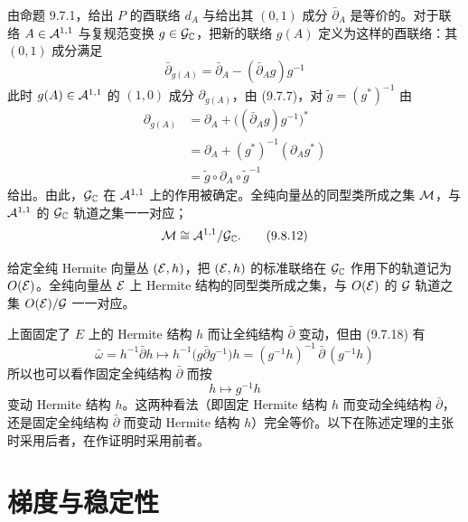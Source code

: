 由命题 9.7.1，给出 $P$ 的酉联络 $d_A$ 与给出其 $(0,1)$ 成分 $\bar\partial_A$ 是等价的。对于联络 $A\in\mathcal{A}^{1,1}$ 与复规范变换 $g\in\mathcal{G}_{\mathbb{C}}$，把新的联络 $g(A)$ 定义为这样的酉联络：其 $(0,1)$ 成分满足
\begin{equation}
  \bar\partial_{g(A)} = \bar\partial_A - (\bar\partial_A g)g^{-1}
  \tag{9.8.8}
\end{equation}
此时 $g(A)\in\mathcal{A}^{1,1}$ 的 $(1,0)$ 成分 $\partial_{g(A)}$，由 (9.7.7)，对 $\tilde g=(g^*)^{-1}$ 由
\begin{align}
  \partial_{g(A)} &= \partial_A + \bigl((\bar\partial_A g)g^{-1}\bigr)^*
  \tag{9.8.9}\\
  &= \partial_A + (g^*)^{-1}(\partial_A g^*)
  \tag{9.8.10}\\
  &= \tilde g\circ\partial_A\circ\tilde g^{-1}
  \tag{9.8.11}
\end{align}
给出。由此，$\mathcal{G}_{\mathbb{C}}$ 在 $\mathcal{A}^{1,1}$ 上的作用被确定。全纯向量丛的同型类所成之集 $\mathcal{M}$，与 $\mathcal{A}^{1,1}$ 的 $\mathcal{G}_{\mathbb{C}}$ 轨道之集一一对应；
\begin{equation}
  \mathcal{M} \cong \mathcal{A}^{1,1}/\mathcal{G}_{\mathbb{C}}.
  \tag{9.8.12}
\end{equation}

给定全纯 Hermite 向量丛 $(\mathcal{E},h)$，把 $(\mathcal{E},h)$ 的标准联络在 $\mathcal{G}_{\mathbb{C}}$ 作用下的轨道记为 $O(\mathcal{E})$。全纯向量丛 $\mathcal{E}$ 上 Hermite 结构的同型类所成之集，与 $O(\mathcal{E})$ 的 $\mathcal{G}$ 轨道之集 $O(\mathcal{E})/\mathcal{G}$ 一一对应。

上面固定了 $E$ 上的 Hermite 结构 $h$ 而让全纯结构 $\bar\partial$ 变动，但由 (9.7.18) 有
\begin{equation}
  \bar\omega = h^{-1}\bar\partial h
  \mapsto h^{-1}\bigl(g\bar\partial g^{-1}\bigr)h
  = (g^{-1}h)^{-1}\,\bar\partial\,(g^{-1}h)
  \tag{9.8.13}
\end{equation}
所以也可以看作固定全纯结构 $\bar\partial$ 而按
\begin{equation}
  h \mapsto g^{-1}h
  \tag{9.8.14}
\end{equation}
变动 Hermite 结构 $h$。这两种看法（即固定 Hermite 结构 $h$ 而变动全纯结构 $\bar\partial$，还是固定全纯结构 $\bar\partial$ 而变动 Hermite 结构 $h$）完全等价。以下在陈述定理的主张时采用后者，在作证明时采用前者。


\section{梯度与稳定性}

